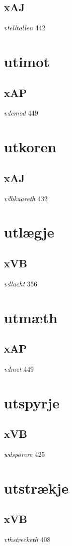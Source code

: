 \documentclass[a4paper,twocolumn]{article}
\begin{document}
\subsection{xAJ}
\label{sec:orga49b065}
\emph{vtelltallen} 442 
\section{utimot}
\label{sec:orgb8d2e22}
\subsection{xAP}
\label{sec:org68c6e9e}
\emph{vdemod} 449 
\section{utkoren}
\label{sec:orgad15baa}
\subsection{xAJ}
\label{sec:org04d9722}
\emph{vdhkaareth} 432 
\section{utlægje}
\label{sec:org6eebde7}
\subsection{xVB}
\label{sec:org4d4ca0d}
\emph{vdlacht} 356 
\section{utmæth}
\label{sec:org89ccac9}
\subsection{xAP}
\label{sec:org24c078e}
\emph{vdmet} 449 
\section{utspyrje}
\label{sec:orga8db289}
\subsection{xVB}
\label{sec:org06f0264}
\emph{wdspørere} 425 
\section{utstrækje}
\label{sec:org2f680c5}
\subsection{xVB}
\label{sec:org6798f05}
\emph{vthstrecketh} 408 
\end{document}
